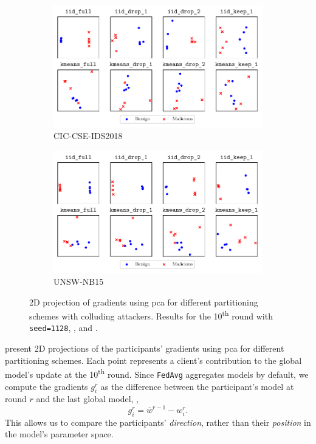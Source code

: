 \begin{figure}[t]
  \centering
  \begin{subfigure}{\linewidth}
    \centering
    \includegraphics[width=.6\linewidth]{figures/cicids/similarity-untargeted-colluding}
    \caption{
      CIC-CSE-IDS2018
      \label{fig:similarity.cicids-colluding}
    }
  \end{subfigure}
  \begin{subfigure}{\linewidth}
    \centering
    \includegraphics[width=.6\linewidth]{figures/nb15/similarity-untargeted-colluding}
    \caption{
      UNSW-NB15
      \label{fig:similarity.nb15-colluding}
    }
  \end{subfigure}
  \caption[
    2D projection of gradients using \gls{pca} for different partitioning schemes with colluding attackers.
  ]{
    2D projection of gradients using \gls{pca} for different partitioning schemes with colluding attackers.
    Results for the 10\textsuperscript{th} round with \texttt{seed=1128}, , and . 
    \label{fig:similarity-colluding}
  }
\end{figure}


 present 2D projections of the participants' gradients using \gls{pca} for different partitioning schemes.
Each point represents a client's contribution to the global model's update at the 10\textsuperscript{th} round.
Since \texttt{FedAvg} aggregates models by default, we compute the gradients $g_i^r$ as the difference between the participant's model at round $r$ and the last global model, \ie,
\begin{equation}
  g_i^r = \bar{w}^{r-1} - w_i^r.
\end{equation}
This allows us to compare the participants' \emph{direction}, rather than their \emph{position} in the model's parameter space.

